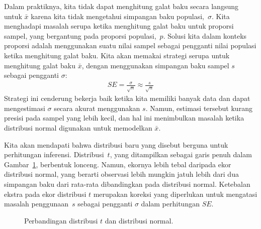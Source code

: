 Dalam praktiknya, kita tidak dapat menghitung galat baku secara langsung
untuk $\bar{x}$ karena kita tidak mengetahui simpangan baku
populasi,~$\sigma$.
Kita menghadapi masalah serupa ketika menghitung galat
baku untuk proporsi sampel, yang bergantung pada proporsi
populasi,~$p$.
Solusi kita dalam konteks proporsi adalah menggunakan suatu nilai
sampel sebagai pengganti
nilai populasi ketika menghitung galat baku.
Kita akan memakai strategi serupa untuk menghitung galat
baku $\bar{x}$, dengan menggunakan simpangan
baku sampel $s$ sebagai pengganti $\sigma$:
\begin{align*}
SE = \frac{\sigma}{\sqrt{n}} \approx \frac{s}{\sqrt{n}}
\end{align*}
Strategi ini cenderung bekerja baik ketika kita memiliki
banyak data dan dapat mengestimasi $\sigma$ secara akurat menggunakan $s$.
Namun, estimasi tersebut kurang presisi pada sampel yang lebih kecil,
dan hal ini menimbulkan masalah ketika distribusi
normal digunakan untuk memodelkan $\bar{x}$.

Kita akan mendapati bahwa distribusi baru yang disebut
 berguna
untuk perhitungan inferensi.
Distribusi~$t$, yang ditampilkan sebagai garis penuh dalam
Gambar~\ref{tDistCompareToNormalDist}, berbentuk lonceng.
Namun, ekornya lebih tebal daripada ekor distribusi normal,
yang berarti observasi lebih mungkin jatuh lebih dari dua
simpangan baku dari rata-rata dibandingkan pada distribusi
normal. %
Ketebalan ekstra pada ekor distribusi $t$ merupakan
koreksi yang diperlukan untuk mengatasi masalah penggunaan~$s$
sebagai pengganti $\sigma$ dalam perhitungan $SE$.

\begin{figure}[h]
  \centering
  \caption{Perbandingan distribusi $t$
      dan distribusi normal.}
  \label{tDistCompareToNormalDist}
\end{figure}

